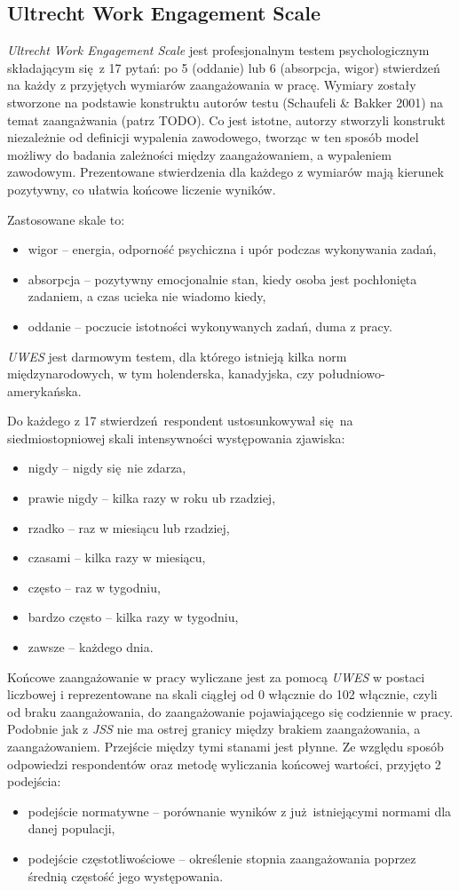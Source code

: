 \subsection{Ultrecht Work Engagement Scale}
\emph{Ultrecht Work Engagement Scale} jest profesjonalnym testem psychologicznym składającym się z 17 pytań: po 5 (oddanie) lub 6 (absorpcja, wigor) stwierdzeń na każdy z przyjętych wymiarów zaangażowania w pracę. Wymiary zostały stworzone na podstawie konstruktu autorów testu (Schaufeli \& Bakker 2001) na temat zaangażwania (patrz TODO). Co jest istotne, autorzy stworzyli konstrukt niezależnie od definicji wypalenia zawodowego, tworząc w ten sposób model możliwy do
badania zależności między zaangażowaniem, a wypaleniem zawodowym. Prezentowane stwierdzenia dla każdego z wymiarów mają kierunek pozytywny, co ułatwia końcowe liczenie wyników.

Zastosowane skale to:
\begin{itemize}
\item wigor -- energia, odporność psychiczna i upór podczas wykonywania zadań,
\item absorpcja -- pozytywny emocjonalnie stan, kiedy osoba jest pochłonięta zadaniem, a czas ucieka nie wiadomo kiedy,
\item oddanie -- poczucie istotności wykonywanych zadań, duma z pracy.
\end{itemize}

\emph{UWES} jest darmowym testem, dla którego istnieją kilka norm międzynarodowych, w tym holenderska, kanadyjska, czy południowo-amerykańska. 

Do każdego z 17 stwierdzeń respondent ustosunkowywał się na siedmiostopniowej skali intensywności występowania zjawiska:
\begin{itemize}
\item nigdy -- nigdy się nie zdarza,
\item prawie nigdy -- kilka razy w roku ub rzadziej,
\item rzadko -- raz w miesiącu lub rzadziej,
\item czasami -- kilka razy w miesiącu,
\item często -- raz w tygodniu,
\item bardzo często -- kilka razy w tygodniu,
\item zawsze -- każdego dnia.
\end{itemize}

Końcowe zaangażowanie w pracy wyliczane jest za pomocą \emph{UWES} w postaci liczbowej i reprezentowane na skali ciągłej od 0 włącznie do 102 włącznie, czyli od braku zaangażowania, do zaangażowanie pojawiającego się codziennie w pracy. Podobnie jak z \emph{JSS} nie ma ostrej granicy między brakiem zaangażowania, a zaangażowaniem. Przejście między tymi stanami jest płynne. Ze względu sposób odpowiedzi respondentów oraz metodę wyliczania końcowej wartości, przyjęto 2
podejścia:
\begin{itemize}
\item podejście normatywne -- porównanie wyników z już istniejącymi normami dla danej populacji,
\item podejście częstotliwościowe -- określenie stopnia zaangażowania poprzez średnią częstość jego występowania.
\end{itemize}
